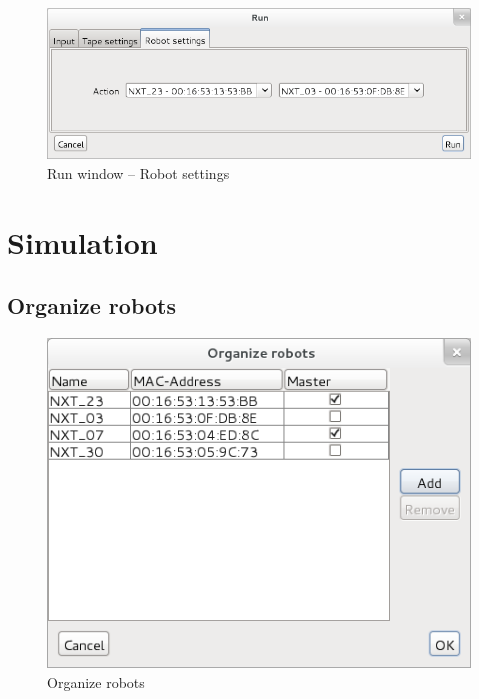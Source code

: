 \documentclass[%
  a4paper,%
  11pt,%
  blue,%
  hyperref	%
  ]{tubsartcl}
\begin{document}
\begin{figure}[!htb]
\begin{center}
\includegraphics[scale=0.5]{graphics_gui/run_window_robot_settings.png}
\end{center}
\caption{Run window -- Robot settings}
\label{pic:run_window_robot_settings}
\end{figure}

\newpage

\section{Simulation}

\subsection{Organize robots}

\begin{figure}[!htb]
\begin{center}
\includegraphics[scale=0.45]{graphics_gui/organize_robots.png}
\end{center}
\caption{Organize robots}
\label{pic:organize_robots}
\end{figure}
\end{document}
